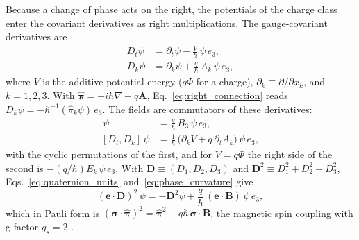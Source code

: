 \documentclass[aps,prd,onecolumn,tightenlines,nofootinbib,notitlepage,11pt,floatfix]{revtex4-2}
\theoremstyle{indentedtheorem}
\begin{document}
Because a change of phase acts on the right, the potentials of the charge class enter the covariant derivatives as right multiplications. The gauge-covariant derivatives are
\begin{align}
    D_t\psi &= \partial_t\psi - \frac{V}{\hbar}\,\psi\,e_3 ,
    \label{eq:phase_connection_time} \\
    D_k\psi &= \partial_k\psi + \frac{q}{\hbar}\,A_k\,\psi\,e_3 ,
    \label{eq:right_connection}
\end{align}
where $V$ is the additive potential energy ($q\Phi$ for a charge), $\partial_k\equiv\partial/\partial x_k$, and $k=1,2,3$. With $\hat{\boldsymbol{\pi}}=-i\hbar\nabla-q\mathbf{A}$, Eq.~\eqref{eq:right_connection} reads $D_k\psi=-\hbar^{-1}(\hat{\pi}_k\psi)\,e_3$. The fields are commutators of these derivatives:
\begin{align}
    [D_1,D_2]\,\psi &= \frac{q}{\hbar}\,B_3\,\psi\,e_3 ,
    \label{eq:phase_curvature} \\
    [D_t,D_k]\,\psi &= \frac{1}{\hbar}\,\big(\partial_kV+q\,\partial_tA_k\big)\,\psi\,e_3 ,
    \label{eq:time_space_curvature}
\end{align}
with the cyclic permutations of the first, and for $V=q\Phi$ the right side of the second is $-(q/\hbar)E_k\,\psi\,e_3$. With $\mathbf{D}\equiv(D_1,D_2,D_3)$ and $\mathbf{D}^2\equiv D_1^2+D_2^2+D_3^2$, Eqs.~\eqref{eq:quaternion_units} and~\eqref{eq:phase_curvature} give
\begin{equation}
    (\mathbf{e}\cdot\mathbf{D})^2\,\psi = -\mathbf{D}^2\psi + \frac{q}{\hbar}\,(\mathbf{e}\cdot\mathbf{B})\,\psi\,e_3 ,
    \label{eq:fueter_square}
\end{equation}
which in Pauli form is $(\boldsymbol{\sigma}\cdot\hat{\boldsymbol{\pi}})^2=\hat{\boldsymbol{\pi}}^2-q\hbar\,\boldsymbol{\sigma}\cdot\mathbf{B}$, the magnetic spin coupling with g-factor $g_s=2$ \citep{Dirac1928Quantum}.
\end{document}
